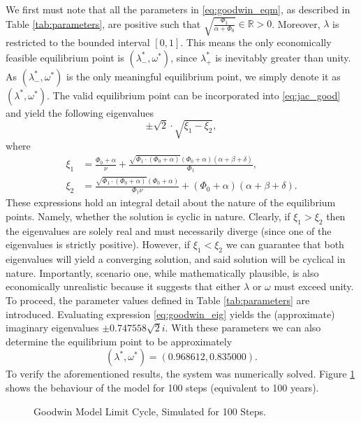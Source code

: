 \documentclass[12pt, centerh1]{article}
\begin{document}
We first must note that all the parameters in \eqref{eq:goodwin_eqm}, as described in Table \ref{tab:parameters}, are positive such that $\sqrt{\frac{\Phi_1}{\alpha + \Phi_0}} \in\mathbb R > 0$. Moreover, $\lambda$ is restricted to the bounded interval $[0, 1]$. This means the only economically feasible equilibrium point is $(\lambda_-^\ast, \omega^\ast)$, since $\lambda_+^\ast$ is inevitably greater than unity. As $(\lambda_-^\ast, \omega^\ast)$ is the only meaningful equilibrium point, we simply denote it as $(\lambda^\ast, \omega^\ast)$. The valid equilibrium point can be incorporated into \eqref{eq:jac_good} and yield the following eigenvalues
\begin{equation} \label{eq:goodwin_eig}
    \pm\sqrt 2\cdot\sqrt{\xi_1 - \xi_2},
\end{equation}
where
\begin{equation*}
\begin{split}
    \xi_1 &= \frac{\Phi_0 + \alpha}{\nu} + \frac{\sqrt{\Phi_1\cdot(\Phi_0 + \alpha)}(\Phi_0+\alpha)(\alpha+\beta+\delta)}{\Phi_1},\\
    \xi_2 &= \frac{\sqrt{\Phi_1\cdot(\Phi_0 + \alpha)}(\Phi_0 + \alpha)}{\Phi_1\nu} + (\Phi_0+\alpha)(\alpha+\beta+\delta).
    \end{split}
\end{equation*}
These expressions hold an integral detail about the nature of the equilibrium points. Namely, whether the solution is cyclic in nature. Clearly, if $\xi_1>\xi_2$ then the eigenvalues are solely real and must necessarily diverge (since one of the eigenvalues is strictly positive). However, if $\xi_1<\xi_2$ we can guarantee that both eigenvalues will yield a converging solution, and said solution will be cyclical in nature. Importantly, scenario one, while mathematically plausible, is also economically unrealistic because it suggests that either $\lambda$ or $\omega$ must exceed unity. To proceed, the parameter values defined in Table \ref{tab:parameters} are introduced. Evaluating expression \eqref{eq:goodwin_eig} yields the (approximate) imaginary eigenvalues $\pm0.747558\sqrt{2}i$.
With these parameters we can also determine the equilibrium point to be approximately
\begin{equation}
    (\lambda^\ast, \omega^\ast) = (0.968612, 0.835000).
\end{equation}
\noindent
To verify the aforementioned results, the system was numerically solved. Figure \ref{fig:goodwin} shows the behaviour of the model for 100 steps (equivalent to 100 years). 
\begin{figure}[H]
    \centering
    
    \caption{Goodwin Model Limit Cycle, Simulated for 100 Steps.}
    \label{fig:goodwin}
\end{figure}
\end{document}
